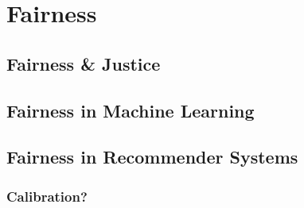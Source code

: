 \chapter{Fairness}
\label{fairness}



\section{Fairness \& Justice}
\section{Fairness in Machine Learning}

\section{Fairness in Recommender Systems}
\subsection{Calibration?}

